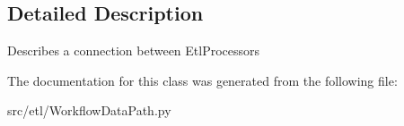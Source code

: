 \subsection{Detailed Description}
\begin{DoxyVerb}Describes a connection between EtlProcessors\end{DoxyVerb}
 

The documentation for this class was generated from the following file\-:\begin{DoxyCompactItemize}
\item 
src/etl/Workflow\-Data\-Path.\-py\end{DoxyCompactItemize}
